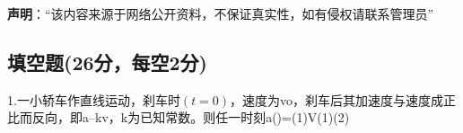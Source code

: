 
\textbf{声明}：“该内容来源于网络公开资料，不保证真实性，如有侵权请联系管理员”

\subsection{填空题(26分，每空2分)}
1.一小轿车作直线运动，刹车时$(t=0)$，速度为vo，刹车后其加速度与速度成正比而反向，即a--kv，k为已知常数。则任一时刻a()=(1)V(1)(2)